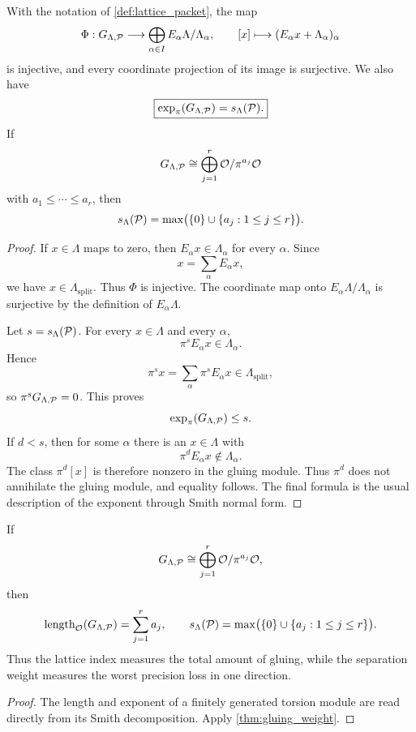 \begin{theorem}\label{thm:gluing_weight}
With the notation of \cref{def:lattice_packet}, the map
\[
\Phi:G_{\Lambda,\mathcal P}
\longrightarrow
\bigoplus_{\alpha\in I}E_\alpha\Lambda/\Lambda_\alpha,
\qquad
[x]\longmapsto(E_\alpha x+\Lambda_\alpha)_\alpha
\]
is injective, and every coordinate projection of its image is surjective.  We also have
\[
\boxed{
\operatorname{exp}_\pi(G_{\Lambda,\mathcal P})
=
s_\Lambda(\mathcal P).
}
\]
If
\[
G_{\Lambda,\mathcal P}
\cong
\bigoplus_{j=1}^r{\mathcal O}/\pi^{a_j}{\mathcal O}
\]
with $a_1\leq\cdots\leq a_r$, then
\[
s_\Lambda(\mathcal P)=\max\bigl(\{0\}\cup\{a_j:1\leq j\leq r\}\bigr).
\]
\end{theorem}

\begin{proof}
If $x\in\Lambda$ maps to zero, then $E_\alpha x\in\Lambda_\alpha$ for every $\alpha$.  Since
\[
x=\sum_\alpha E_\alpha x,
\]
we have $x\in\Lambda_{\mathrm{split}}$.  Thus $\Phi$ is injective.  The coordinate map onto $E_\alpha\Lambda/\Lambda_\alpha$ is surjective by the definition of $E_\alpha\Lambda$.

Let $s=s_\Lambda(\mathcal P)$.  For every $x\in\Lambda$ and every $\alpha$,
\[
\pi^sE_\alpha x\in\Lambda_\alpha.
\]
Hence
\[
\pi^sx=\sum_\alpha\pi^sE_\alpha x\in\Lambda_{\mathrm{split}},
\]
so $\pi^sG_{\Lambda,\mathcal P}=0$.  This proves
\[
\operatorname{exp}_\pi(G_{\Lambda,\mathcal P})\leq s.
\]
If $d<s$, then for some $\alpha$ there is an $x\in\Lambda$ with
\[
\pi^dE_\alpha x\notin\Lambda_\alpha.
\]
The class $\pi^d[x]$ is therefore nonzero in the gluing module.  Thus $\pi^d$ does not annihilate the gluing module, and equality follows.  The final formula is the usual description of the exponent through Smith normal form.
\end{proof}

\begin{corollary}\label{cor:length_and_weight}
If
\[
G_{\Lambda,\mathcal P}
\cong
\bigoplus_{j=1}^r{\mathcal O}/\pi^{a_j}{\mathcal O},
\]
then
\[
\operatorname{length}_{{\mathcal O}}(G_{\Lambda,\mathcal P})
=
\sum_{j=1}^ra_j,
\qquad
s_\Lambda(\mathcal P)=\max\bigl(\{0\}\cup\{a_j:1\leq j\leq r\}\bigr).
\]
Thus the lattice index measures the total amount of gluing, while the separation weight measures the worst precision loss in one direction.
\end{corollary}

\begin{proof}
The length and exponent of a finitely generated torsion module are read directly from its Smith decomposition.  Apply \cref{thm:gluing_weight}.
\end{proof}

